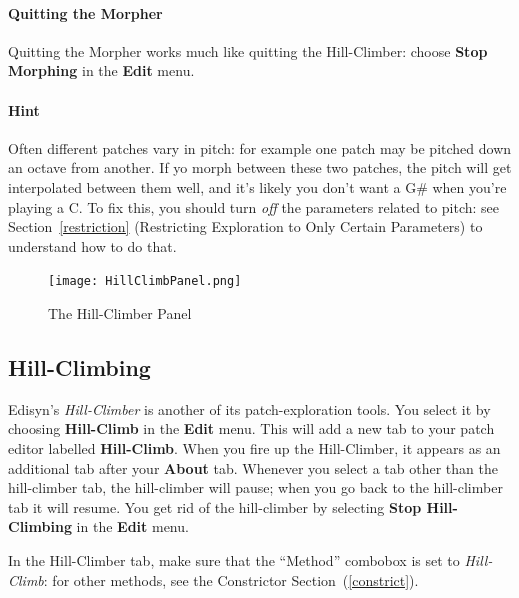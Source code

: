 \documentclass{article}
\begin{document}
\paragraph{Quitting the Morpher} Quitting the Morpher works much like quitting the Hill-Climber: choose {\bf  Stop Morphing} in the {\bf Edit} menu.

\paragraph{\color{red}Hint} Often different patches vary in pitch: for example one patch may be pitched down an octave from another.  If yo morph between these two patches, the pitch will get interpolated between them well, and it's likely you don't want a G\# when you're playing a C.  To fix this, you should turn {\it off} the parameters related to pitch: see Section~\ref{restriction} (Restricting Exploration to Only Certain Parameters) to understand how to do that.




\begin{figure}
\vspace{-2em}\texttt{[image: HillClimbPanel.png]}
\vspace{-3em}
\caption{The Hill-Climber Panel}
\vspace{-2em}
\label{hcpanel}
\end{figure}

\subsection{Hill-Climbing}
\label{hillclimb}

Edisyn's {\it Hill-Climber} is another of its patch-exploration tools.  You select it by choosing {\bf Hill-Climb} in the {\bf Edit} menu.  This will add a new tab to your patch editor labelled {\bf Hill-Climb}.   When you fire up the Hill-Climber, it appears as an additional tab after your {\bf About} tab.  Whenever you select a tab other than the hill-climber tab, the hill-climber will pause; when you go back to the hill-climber tab it will resume.  You get rid of the hill-climber by selecting {\bf Stop Hill-Climbing} in the {\bf Edit} menu. 

In the Hill-Climber tab, make sure that the ``Method'' combobox is set to {\it Hill-Climb}: for other methods, see the Constrictor Section~(\ref{constrict}).
\end{document}
